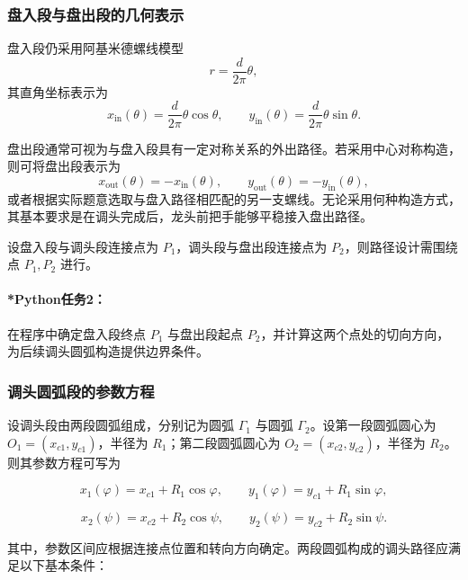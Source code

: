 \documentclass[12pt,a4paper]{ctexart}
\begin{document}
\subsubsection{盘入段与盘出段的几何表示}
盘入段仍采用阿基米德螺线模型
\begin{equation}
r=\frac{d}{2\pi}\theta,
\end{equation}
其直角坐标表示为
\begin{equation}
x_{\mathrm{in}}(\theta)=\frac{d}{2\pi}\theta\cos\theta,
\qquad
y_{\mathrm{in}}(\theta)=\frac{d}{2\pi}\theta\sin\theta.
\end{equation}

盘出段通常可视为与盘入段具有一定对称关系的外出路径。若采用中心对称构造，则可将盘出段表示为
\begin{equation}
x_{\mathrm{out}}(\theta)=-x_{\mathrm{in}}(\theta),\qquad
y_{\mathrm{out}}(\theta)=-y_{\mathrm{in}}(\theta),
\end{equation}
或者根据实际题意选取与盘入路径相匹配的另一支螺线。无论采用何种构造方式，其基本要求是在调头完成后，龙头前把手能够平稳接入盘出路径。

设盘入段与调头段连接点为 $P_1$，调头段与盘出段连接点为 $P_2$，则路径设计需围绕点 $P_1,P_2$ 进行。

\paragraph{*Python任务2：}
在程序中确定盘入段终点 $P_1$ 与盘出段起点 $P_2$，并计算这两个点处的切向方向，为后续调头圆弧构造提供边界条件。

\subsubsection{调头圆弧段的参数方程}
设调头段由两段圆弧组成，分别记为圆弧 $\Gamma_1$ 与圆弧 $\Gamma_2$。设第一段圆弧圆心为 $O_1=(x_{c1},y_{c1})$，半径为 $R_1$；第二段圆弧圆心为 $O_2=(x_{c2},y_{c2})$，半径为 $R_2$。则其参数方程可写为

\begin{equation}
x_1(\varphi)=x_{c1}+R_1\cos\varphi,\qquad
y_1(\varphi)=y_{c1}+R_1\sin\varphi,
\end{equation}

\begin{equation}
x_2(\psi)=x_{c2}+R_2\cos\psi,\qquad
y_2(\psi)=y_{c2}+R_2\sin\psi.
\end{equation}

其中，参数区间应根据连接点位置和转向方向确定。两段圆弧构成的调头路径应满足以下基本条件：
\end{document}
